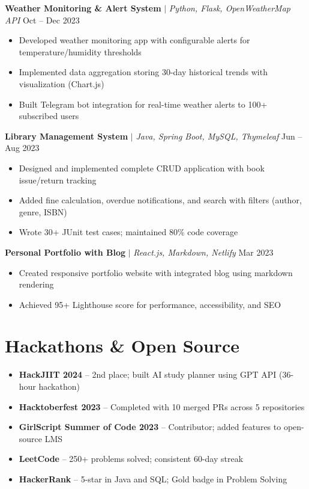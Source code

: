 \documentclass[10pt,a4paper]{article}
\begin{document}
\vspace{3pt}
\textbf{\color{accent}Weather Monitoring \& Alert System} $\mid$ \textit{Python, Flask, OpenWeatherMap API} \hfill Oct -- Dec 2023
\begin{itemize}
    \item Developed weather monitoring app with configurable alerts for temperature/humidity thresholds
    \item Implemented data aggregation storing 30-day historical trends with visualization (Chart.js)
    \item Built Telegram bot integration for real-time weather alerts to 100+ subscribed users
\end{itemize}

\vspace{3pt}
\textbf{\color{accent}Library Management System} $\mid$ \textit{Java, Spring Boot, MySQL, Thymeleaf} \hfill Jun -- Aug 2023
\begin{itemize}
    \item Designed and implemented complete CRUD application with book issue/return tracking
    \item Added fine calculation, overdue notifications, and search with filters (author, genre, ISBN)
    \item Wrote 30+ JUnit test cases; maintained 80\% code coverage
\end{itemize}

\vspace{3pt}
\textbf{\color{accent}Personal Portfolio with Blog} $\mid$ \textit{React.js, Markdown, Netlify} \hfill Mar 2023
\begin{itemize}
    \item Created responsive portfolio website with integrated blog using markdown rendering
    \item Achieved 95+ Lighthouse score for performance, accessibility, and SEO
\end{itemize}

\section{Hackathons \& Open Source}
\begin{itemize}
    \item \textbf{HackJIIT 2024} -- 2nd place; built AI study planner using GPT API (36-hour hackathon)
    \item \textbf{Hacktoberfest 2023} -- Completed with 10 merged PRs across 5 repositories
    \item \textbf{GirlScript Summer of Code 2023} -- Contributor; added features to open-source LMS
    \item \textbf{LeetCode} -- 250+ problems solved; consistent 60-day streak
    \item \textbf{HackerRank} -- 5-star in Java and SQL; Gold badge in Problem Solving
\end{itemize}
\end{document}

